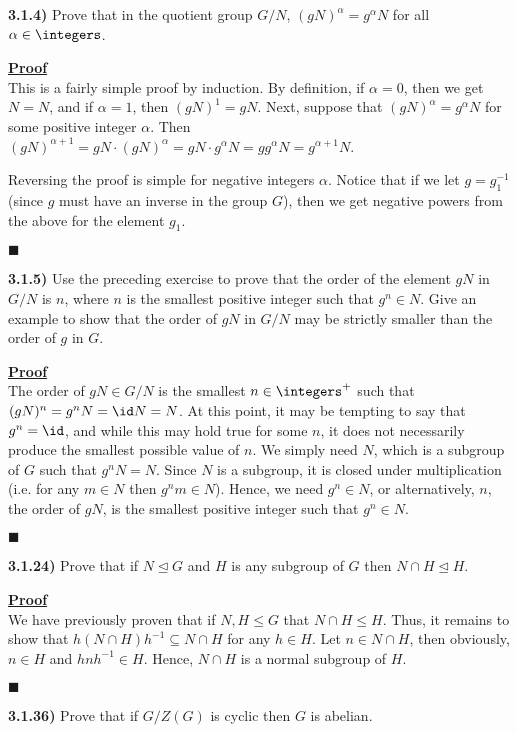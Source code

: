 \documentclass[12pt,a4paper]{article}
\newcommand{\prob}[2]{\textbf{#1)} #2}
\newenvironment{proof}
{
\textbf{\underline{Proof}} \\
}
{
\begin{flushright}
$\blacksquare$
\end{flushright}}
\begin{document}
\prob{3.1.4}{Prove that in the quotient group $G/N$, $(gN)^{\alpha} = g^{\alpha}N$ for all $\alpha \in \integers$.}

\begin{proof}
This is a fairly simple proof by induction. By definition, if $\alpha = 0$, then we get $N = N$, and if $\alpha = 1$, then $(gN)^{1} = gN$. Next, suppose that $(gN)^{\alpha} = g^{\alpha}N$ for some positive integer $\alpha$. Then $(gN)^{\alpha + 1} = gN \cdot (gN)^{\alpha} = gN \cdot g^{\alpha}N = gg^{\alpha}N = g^{\alpha+1}N$.

Reversing the proof is simple for negative integers $\alpha$. Notice that if we let $g = g_1^{-1}$ (since $g$ must have an inverse in the group $G$), then we get negative powers from the above for the element $g_1$.
\end{proof}

\prob{3.1.5}{Use the preceding exercise to prove that the order of the element $gN$ in $G/N$ is $n$, where $n$ is the smallest positive integer such that $g^n \in N$. Give an example to show that the order of $gN$ in $G/N$ may be strictly smaller than the order of $g$ in $G$.}

\begin{proof}
The order of $gN \in G/N$ is the smallest $n \in \integers^{+}$ such that $(gN)^{n} = g^nN = \id N = N$. At this point, it may be tempting to say that $g^n = \id$, and while this may hold true for some $n$, it does not necessarily produce the smallest possible value of $n$. We simply need $N$, which is a subgroup of $G$ such that $g^nN = N$. Since $N$ is a subgroup, it is closed under multiplication (i.e. for any $m \in N$ then $g^n m \in N$). Hence, we need $g^n \in N$, or alternatively, $n$, the order of $gN$, is the smallest positive integer such that $g^n \in N$.
\end{proof}

\prob{3.1.24}{Prove that if $N \trianglelefteq G$ and $H$ is any subgroup of $G$ then $N \cap H \trianglelefteq H$.}

\begin{proof}
We have previously proven that if $N,H \leq G$ that $N \cap H \leq H$. Thus, it remains to show that $h(N \cap H)h^{-1} \subseteq N \cap H$ for any $h \in H$. Let $n \in N \cap H$, then obviously, $n \in H$ and $hnh^{-1} \in H$. Hence, $N \cap H$ is a normal subgroup of $H$.
\end{proof}

\prob{3.1.36}{Prove that if $G/Z(G)$ is cyclic then $G$ is abelian.}
\end{document}

